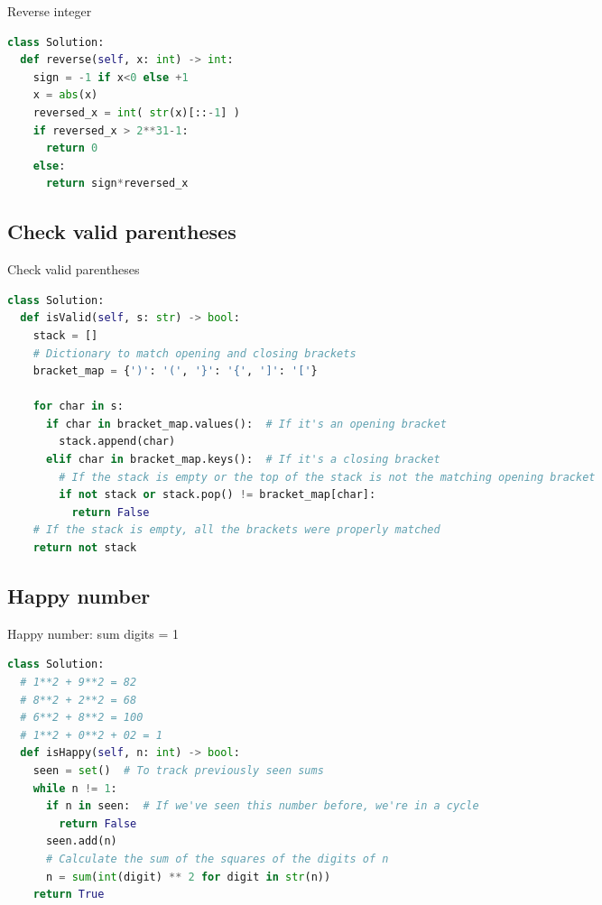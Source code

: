 \documentclass[a4paper,12pt]{article}
\begin{document}
\begin{multicols}{2}
\begin{mycode}[label={lst:reverse-integer}]{Reverse integer}
\begin{lstlisting}[language=Python]
class Solution:
  def reverse(self, x: int) -> int:
    sign = -1 if x<0 else +1
    x = abs(x)
    reversed_x = int( str(x)[::-1] )
    if reversed_x > 2**31-1:
      return 0
    else:
      return sign*reversed_x
\end{lstlisting}
\end{mycode}

\subsection{Check valid parentheses}

\begin{mycode}[label={lst:check-valid-parentheses}]{Check valid parentheses}
\begin{lstlisting}[language=Python]
class Solution:
  def isValid(self, s: str) -> bool:
    stack = []
    # Dictionary to match opening and closing brackets
    bracket_map = {')': '(', '}': '{', ']': '['}

    for char in s:
      if char in bracket_map.values():  # If it's an opening bracket
        stack.append(char)
      elif char in bracket_map.keys():  # If it's a closing bracket
        # If the stack is empty or the top of the stack is not the matching opening bracket
        if not stack or stack.pop() != bracket_map[char]:
          return False
    # If the stack is empty, all the brackets were properly matched
    return not stack
\end{lstlisting}
\end{mycode}

\subsection{Happy number}

\begin{mycode}[label={lst:is-happy-number}]{Happy number: sum digits = 1}
\begin{lstlisting}[language=Python]
class Solution:
  # 1**2 + 9**2 = 82
  # 8**2 + 2**2 = 68
  # 6**2 + 8**2 = 100
  # 1**2 + 0**2 + 02 = 1
  def isHappy(self, n: int) -> bool:
    seen = set()  # To track previously seen sums
    while n != 1:
      if n in seen:  # If we've seen this number before, we're in a cycle
        return False
      seen.add(n)
      # Calculate the sum of the squares of the digits of n
      n = sum(int(digit) ** 2 for digit in str(n))
    return True
\end{lstlisting}
\end{mycode}


\end{multicols}
\end{document}
